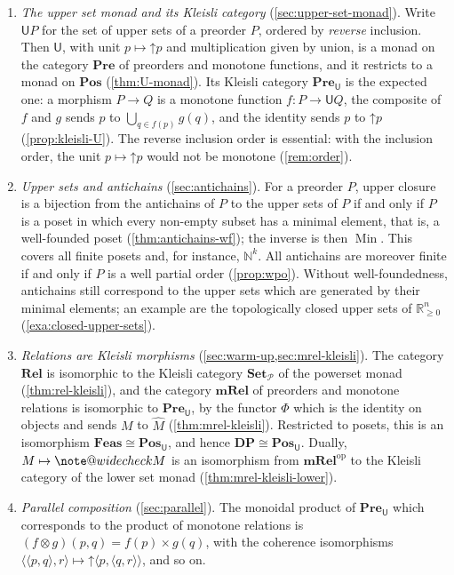 \documentclass[11pt,a4paper]{article}
\makeatletter
\theoremstyle{plain}
\theoremstyle{definition}
\theoremstyle{remark}
\providecommand{\widecheck}[1]{\mathpalette\note@widecheck{#1}}
\newcommand{\note@widecheck}[2]{%
    \begingroup
    \setbox\z@\hbox{$\m@th#1#2$}%
    \setbox\tw@\hbox{$\m@th#1\widehat{\vrule width\wd\z@ height\z@ depth\z@}$}%
    \setbox4\hbox{$\m@th#1\widehat{#2}$}%
    \rlap{\smash{\raise\dimexpr\ht\z@+\ht\tw@+0.4ex\relax
        \hbox to\wd\z@{\hss\scalebox{1}[-1]{\copy\tw@}\hss}}}%
    \vrule width\z@ height\ht4 depth\z@
    \box\z@
    \endgroup
}
\newcommand{\Cat}[1]{\mathbf{#1}}
\newcommand{\Set}{\Cat{Set}}
\newcommand{\Rel}{\Cat{Rel}}
\newcommand{\Pre}{\Cat{Pre}}
\newcommand{\Pos}{\Cat{Pos}}
\newcommand{\mRel}{\Cat{mRel}}
\newcommand{\Feas}{\Cat{Feas}}
\newcommand{\DP}{\Cat{DP}}
\newcommand{\U}{\mathsf{U}}
\newcommand{\pow}{\mathcal{P}}
\newcommand{\SetP}{\Set_{\pow}}
\newcommand{\PreU}{\Pre_{\U}}
\newcommand{\PosU}{\Pos_{\U}}
\newcommand{\tup}[1]{\langle #1 \rangle}
\newcommand{\up}{\mathord{\uparrow}}
\newcommand{\op}{^{\mathrm{op}}}
\DeclareMathOperator{\Min}{Min}
\newcommand{\N}{\mathbb{N}}
\newcommand{\Rp}{\mathbb{R}_{\geq 0}}
\makeatother
\begin{document}
\begin{enumerate}[leftmargin=2em]
    \item \emph{The upper set monad and its Kleisli category} (\cref{sec:upper-set-monad}).
          Write $\U P$ for the set of upper sets of a preorder $P$, ordered by \emph{reverse} inclusion.
          Then $\U$, with unit $p \mapsto \up p$ and multiplication given by union, is a monad on the category $\Pre$ of preorders and monotone functions, and it restricts to a monad on $\Pos$ (\cref{thm:U-monad}).
          Its Kleisli category $\PreU$ is the expected one: a morphism $P \to Q$ is a monotone function $f \colon P \to \U Q$, the composite of $f$ and $g$ sends $p$ to $\bigcup_{q \in f(p)} g(q)$, and the identity sends $p$ to $\up p$ (\cref{prop:kleisli-U}).
          The reverse inclusion order is essential: with the inclusion order, the unit $p \mapsto \up p$ would not be monotone (\cref{rem:order}).
    \item \emph{Upper sets and antichains} (\cref{sec:antichains}).
          For a preorder $P$, upper closure is a bijection from the antichains of $P$ to the upper sets of $P$ if and only if $P$ is a poset in which every non-empty subset has a minimal element, that is, a well-founded poset (\cref{thm:antichains-wf}); the inverse is then $\Min$.
          This covers all finite posets and, for instance, $\N^k$.
          All antichains are moreover finite if and only if $P$ is a well partial order (\cref{prop:wpo}).
          Without well-foundedness, antichains still correspond to the upper sets which are generated by their minimal elements; an example are the topologically closed upper sets of $\Rp^n$ (\cref{exa:closed-upper-sets}).
    \item \emph{Relations are Kleisli morphisms} (\cref{sec:warm-up,sec:mrel-kleisli}).
          The category $\Rel$ is isomorphic to the Kleisli category $\SetP$ of the powerset monad (\cref{thm:rel-kleisli}), and the category $\mRel$ of preorders and monotone relations is isomorphic to $\PreU$, by the functor $\Phi$ which is the identity on objects and sends $M$ to $\widehat{M}$ (\cref{thm:mrel-kleisli}).
          Restricted to posets, this is an isomorphism $\Feas \cong \PosU$, and hence $\DP \cong \PosU$.
          Dually, $M \mapsto \widecheck{M}$ is an isomorphism from $\mRel\op$ to the Kleisli category of the lower set monad (\cref{thm:mrel-kleisli-lower}).
    \item \emph{Parallel composition} (\cref{sec:parallel}).
          The monoidal product of $\PreU$ which corresponds to the product of monotone relations is $(f \otimes g)(p, q) = f(p) \times g(q)$, with the coherence isomorphisms $\tup{\tup{p,q},r} \mapsto \up \tup{p, \tup{q,r}}$, and so on.

\end{enumerate}
\end{document}
